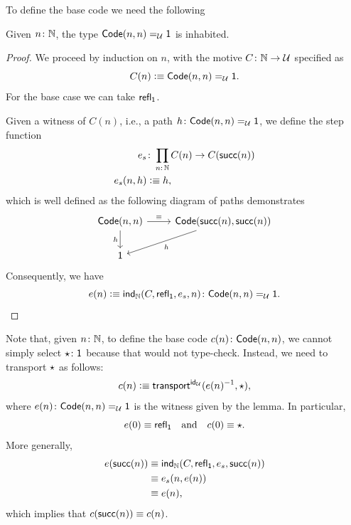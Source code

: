 \begin{description}[font=\normalfont\scshape]
    \item[Base code.] To define the base code we need the following
    
    \begin{lem}
        Given $n\colon\N$, the type $\mathsf{Code}(n,n)\mathrel{=_{\mathcal U}}\mathsf{1}$ is inhabited.
    \end{lem}
    
    \begin{proof}
        We proceed by induction on $n$, with the motive $C\colon\N\to\univ$ specified as
        \[
            C(n)\mathrel{\vcentcolon}\equiv\mathsf{Code}(n,n)\mathrel{=_{\mathcal U}}\mathsf{1}.
        \]
        For the base case we can take $\mathsf{refl}_{\mathsf{1}}$.
        
        Given a witness of $C(n)$, i.e., a path $h\colon\fun{Code}(n,n)\eq\univ\fun1$, we define the step function
        \begin{align*}
            e_s&\colon\prod_{n\colon\N}C(n)\to C(\fun{succ}(n))\\
            e_s(n,h)&\defeq h,
        \end{align*}
        which is well defined as the following diagram of paths demonstrates
        \[
            \begin{tikzcd}
                {\fun{Code}(n,n)}
                        \arrow[d,"h"']
                        \arrow[r,"\equiv"]
                    &{\fun{Code}(\fun{succ}(n),\fun{succ}(n))}
                        \arrow[ld,"h"]\\
                \fun1
            \end{tikzcd}
        \]
        Consequently, we have
        \[
            e(n)\defeq\fun{ind}_\N(C,\fun{refl}_{\fun1},e_s,n)
                \colon\fun{Code}(n,n)\eq\univ\fun1.
        \]
    \end{proof}
    Note that, given $n\colon\N$, to define the base code $c(n)\colon\fun{Code}(n,n)$, we cannot simply select $\fun\star\colon\fun1$ because that would not type-check. Instead, we need to transport $\mathsf{\star}$ as follows:
    \[
        c(n)\mathrel{\vcentcolon}\equiv\mathsf{transport}^{\mathsf{id}_\mathcal U}(e(n)^{-1},\mathsf{\star}),
    \]
    where $e(n)\colon\fun{Code}(n,n)\eq\univ\fun1$ is the witness given by the lemma. In particular,
    \[
        e(0)\equiv\mathsf{refl}_{\mathsf{1}}
        \quad\text{and}\quad
        c(0)\equiv\mathsf{\star}.
    \]
    More generally,
    \begin{align*}
        e(\mathsf{succ}(n))
            &\equiv\mathsf{ind}_{\mathbb{N}}(C,\mathsf{refl}_{\mathsf{1}},e_s,\mathsf{succ}(n))\\
            &\equiv e_s(n,e(n))\\
            &\equiv e(n),
    \end{align*}
    which implies that $c(\mathsf{succ}(n))\equiv c(n)$.


\end{description}
